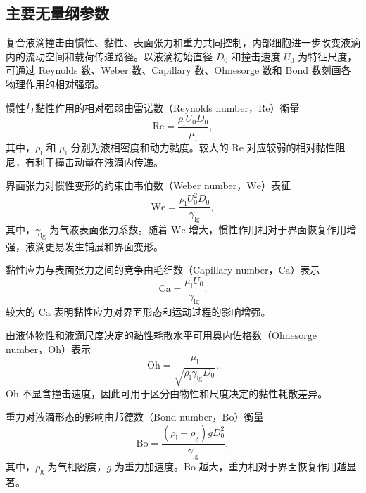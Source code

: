 \subsection{主要无量纲参数}
\label{subsec:ch2_dimensionless}

复合液滴撞击由惯性、黏性、表面张力和重力共同控制，内部细胞进一步改变液滴内的流动空间和载荷传递路径。以液滴初始直径 $D_0$ 和撞击速度 $U_0$ 为特征尺度，可通过 Reynolds 数、Weber 数、Capillary 数、Ohnesorge 数和 Bond 数刻画各物理作用的相对强弱。

惯性与黏性作用的相对强弱由雷诺数（Reynolds number，$\mathrm{Re}$）衡量
\begin{equation}
\mathrm{Re}
=
\frac{\rho_{\mathrm l}U_0D_0}{\mu_{\mathrm l}},
\label{eq:ch2_re}
\end{equation}
其中，$\rho_{\mathrm l}$ 和 $\mu_{\mathrm l}$ 分别为液相密度和动力黏度。较大的 $\mathrm{Re}$ 对应较弱的相对黏性阻尼，有利于撞击动量在液滴内传递。

界面张力对惯性变形的约束由韦伯数（Weber number，$\mathrm{We}$）表征
\begin{equation}
\mathrm{We}
=
\frac{\rho_{\mathrm l}U_0^2D_0}{\gamma_{\mathrm{lg}}},
\label{eq:ch2_we}
\end{equation}
其中，$\gamma_{\mathrm{lg}}$ 为气液表面张力系数。随着 $\mathrm{We}$ 增大，惯性作用相对于界面恢复作用增强，液滴更易发生铺展和界面变形。

黏性应力与表面张力之间的竞争由毛细数（Capillary number，$\mathrm{Ca}$）表示
\begin{equation}
\mathrm{Ca}
=
\frac{\mu_{\mathrm l}U_0}{\gamma_{\mathrm{lg}}}.
\label{eq:ch2_ca}
\end{equation}
较大的 $\mathrm{Ca}$ 表明黏性应力对界面形态和运动过程的影响增强。

由液体物性和液滴尺度决定的黏性耗散水平可用奥内佐格数（Ohnesorge number，$\mathrm{Oh}$）表示
\begin{equation}
\mathrm{Oh}
=
\frac{\mu_{\mathrm l}}
{\sqrt{\rho_{\mathrm l}\gamma_{\mathrm{lg}}D_0}}.
\label{eq:ch2_oh}
\end{equation}
$\mathrm{Oh}$ 不显含撞击速度，因此可用于区分由物性和尺度决定的黏性耗散差异。

重力对液滴形态的影响由邦德数（Bond number，$\mathrm{Bo}$）衡量
\begin{equation}
\mathrm{Bo}
=
\frac{\left(\rho_{\mathrm l}-\rho_{\mathrm g}\right)gD_0^2}
{\gamma_{\mathrm{lg}}},
\label{eq:ch2_bo}
\end{equation}
其中，$\rho_{\mathrm g}$ 为气相密度，$g$ 为重力加速度。$\mathrm{Bo}$ 越大，重力相对于界面恢复作用越显著。

